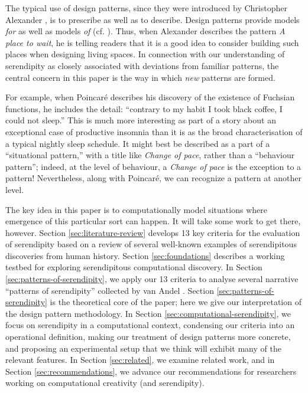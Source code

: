 \documentclass{llncs}
\begin{document}
The typical use of design patterns, since they were introduced by
Christopher Alexander
\cite{alexander1979timeless,alexander1977pattern}, is to prescribe as
well as to describe.  Design patterns provide models \emph{for} as
well as models \emph{of} (cf. \cite[p. 93]{geertz1973interpretation}).
Thus, when Alexander describes the pattern \emph{A place to wait}, he
is telling readers that it is a good idea to consider building such
places when designing living spaces.  In connection with our
understanding of serendipity as closely associated with deviations
from familiar patterns, the central concern in this paper is the way
in which \emph{new} patterns are formed.

For example, when Poincar\'e \cite{poincare1910creation} describes his
discovery of the existence of Fuchsian functions, he includes the
detail: ``contrary to my habit I took black coffee, I could not
sleep.''  This is much more interesting as part of a story about an
exceptional case of productive insomnia than it is as the broad
characterisation of a typical nightly sleep schedule.  It might best
be described as a part of a ``situational pattern,'' with a title like
\emph{Change of pace}, rather than a ``behaviour pattern''; indeed, at
the level of behaviour, a \emph{Change of pace} is the exception to a
pattern!  Nevertheless, along with Poincar\'e, we can recognize a
pattern at another level.

The key idea in this paper is to computationally model situations
where emergence of this particular sort can happen.
%
It will take some work to get there, however.  Section
\ref{sec:literature-review} develops 13 key criteria for the
evaluation of serendipity based on a review of several well-known
examples of serendipitous discoveries from human history.  Section
\ref{sec:foundations} describes a working testbed for exploring
serendipitous computational discovery.  In Section
\ref{sec:patterns-of-serendipity}, we apply our 13 criteria to analyse
several narrative ``patterns of serendipity'' collected by van Andel
\cite{van1994anatomy}.  Section \ref{sec:patterns-of-serendipity} is
the theoretical core of the paper; here we give our interpretation of
the design pattern methodology.  In Section
\ref{sec:computational-serendipity}, we focus on serendipity in a
computational context, condensing our criteria into an operational
definition, making our treatment of design patterns more concrete, and
proposing an experimental setup that we think will exhibit many of the
relevant features.  In Section \ref{sec:related}, we examine related
work, and in Section \ref{sec:recommendations}, we advance our
recommendations for researchers working on computational creativity
(and serendipity).
\end{document}
